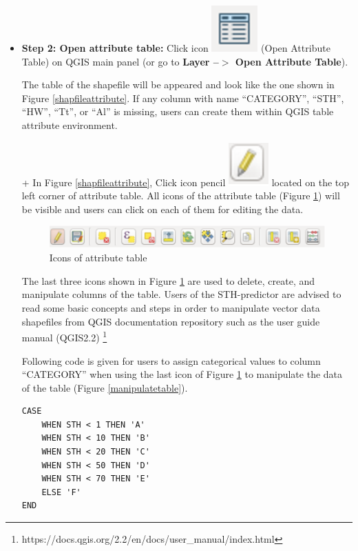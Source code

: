\documentclass[12pt,oneside]{memoir}
\newcommand*{\Openattribute}{\includegraphics[scale=0.5]{attributetableopen}}%
\newcommand*{\openatt}[1]{%
\Openattribute %
}
\newcommand*{\Openpencil}{\includegraphics[scale=0.5]{pencil}}%
\newcommand*{\openpen}[1]{%
\Openpencil %
}
\begin{document}
\begin{itemize}
 \item \textbf{Step 2: Open attribute table:} Click icon \openatt{} (Open Attribute Table) on QGIS main panel (or go to \textbf{Layer --$>$ Open Attribute Table}). 
 
 The table of the shapefile will be appeared and look like the one shown in Figure \ref{shapfileattribute}. If any column with name ``CATEGORY'', ``STH'', ``HW'', ``Tt'', or ``Al'' is missing, users can create them within QGIS table attribute environment.
 
 + In Figure \ref{shapfileattribute}, Click icon pencil \openpen{} located on the top left corner of attribute table. All icons of the attribute table (Figure \ref{tablemenu}) will be visible and users can click on each of them for editing the data.
 
 \begin{figure}[H]
\centering
\includegraphics[scale=0.7]{tablemenu} 
\caption{Icons of attribute table} 
\label{tablemenu}
\end{figure}
 
The last three icons shown in Figure \ref{tablemenu} are used to delete, create, and manipulate columns of the table. Users of the STH-predictor are advised to read some basic concepts and steps in order to manipulate vector data shapefiles from QGIS documentation repository such as the user guide manual (QGIS2.2) \footnote{https://docs.qgis.org/2.2/en/docs/user\_manual/index.html}
 
Following code is given for users to assign categorical values to column ``CATEGORY'' when using the last icon of Figure \ref{tablemenu} to manipulate the data of the table (Figure \ref{manipulatetable}).

\begin{lstlisting}[basicstyle=\tiny,style=nonumbers]
CASE 
	WHEN STH < 1 THEN 'A' 
	WHEN STH < 10 THEN 'B' 
	WHEN STH < 20 THEN 'C' 
	WHEN STH < 50 THEN 'D' 
	WHEN STH < 70 THEN 'E' 
	ELSE 'F'
END
\end{lstlisting}


\end{itemize}
\end{document}
